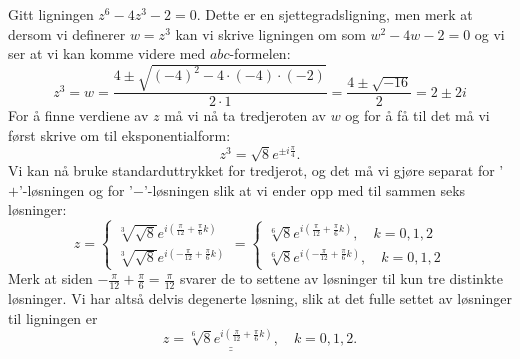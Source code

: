 \documentclass[a4paper,norsk,12pt]{article}
\newcommand{\ans}[1]{\underline{\underline{#1}}}
\newcounter{exa}
\begin{document}
\begin{texample}
Gitt ligningen $z^6 - 4z^3 - 2=0$. Dette er en sjettegradsligning, men merk at dersom vi definerer $w=z^3$ kan vi skrive ligningen om som $w^2 - 4w - 2=0$ og vi ser at vi kan komme videre med $abc$-formelen:
\begin{displaymath}
	z^3 = w = \frac{4\pm\sqrt{(-4)^2-4\cdot(-4)\cdot(-2)}}{2\cdot1} = \frac{4\pm\sqrt{-16}}{2} = 2\pm2i
\end{displaymath}
For å finne verdiene av $z$ må vi nå ta tredjeroten av $w$ og for å få til det må vi først skrive om til eksponentialform:
\begin{displaymath}
	z^3 = \sqrt{8}e^{\pm i\frac{\pi}{4}}.
\end{displaymath}
Vi kan nå bruke standarduttrykket for tredjerot, og det må vi gjøre separat for '$+$'-løsningen og for '$-$'-løsningen slik at vi ender opp med til sammen seks løsninger:
\begin{displaymath}
	z = \begin{cases}
		\sqrt[3]{\sqrt{8}}e^{i\left(\frac{\pi}{12} + \frac{\pi}{6}k\right)} \\
		\sqrt[3]{\sqrt{8}}e^{i\left(-\frac{\pi}{12} + \frac{\pi}{6}k\right)}
	\end{cases}
	= \begin{cases}
		\sqrt[6]{8}e^{i\left(\frac{\pi}{12} + \frac{\pi}{6}k\right)}, \quad k=0, 1, 2 \\
		\sqrt[6]{8}e^{i\left(-\frac{\pi}{12} + \frac{\pi}{6}k\right)}, \quad k = 0, 1, 2
	\end{cases}
\end{displaymath}
Merk at siden $-\frac{\pi}{12} + \frac{\pi}{6} = \frac{\pi}{12}$ svarer de to settene av løsninger til kun tre distinkte løsninger. Vi har altså delvis degenerte løsning, slik at det fulle settet av løsninger til ligningen er 
\begin{displaymath}
	z = \ans{\sqrt[6]{8}e^{i\left(\frac{\pi}{12} + \frac{\pi}{6}k\right)}}, \quad k=0, 1, 2.
\end{displaymath}
\end{texample}

\newpage
\end{document}

